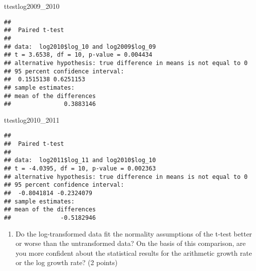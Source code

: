 \documentclass[
]{article}
\newenvironment{Shaded}{\begin{snugshade}}{\end{snugshade}}
\newcommand{\CommentTok}[1]{\textcolor[rgb]{0.56,0.35,0.01}{\textit{#1}}}
\newcommand{\DataTypeTok}[1]{\textcolor[rgb]{0.13,0.29,0.53}{#1}}
\newcommand{\DecValTok}[1]{\textcolor[rgb]{0.00,0.00,0.81}{#1}}
\newcommand{\KeywordTok}[1]{\textcolor[rgb]{0.13,0.29,0.53}{\textbf{#1}}}
\newcommand{\NormalTok}[1]{#1}
\newcommand{\OperatorTok}[1]{\textcolor[rgb]{0.81,0.36,0.00}{\textbf{#1}}}
\newcommand{\OtherTok}[1]{\textcolor[rgb]{0.56,0.35,0.01}{#1}}
\newcommand{\StringTok}[1]{\textcolor[rgb]{0.31,0.60,0.02}{#1}}
\providecommand{\tightlist}{%
  \setlength{\itemsep}{0pt}\setlength{\parskip}{0pt}}
\begin{document}
\begin{Shaded}
\begin{Highlighting}[]
\NormalTok{ttestlog2009_}\DecValTok{2010}
\end{Highlighting}
\end{Shaded}

\begin{verbatim}
## 
##  Paired t-test
## 
## data:  log2010$log_10 and log2009$log_09
## t = 3.6538, df = 10, p-value = 0.004434
## alternative hypothesis: true difference in means is not equal to 0
## 95 percent confidence interval:
##  0.1515138 0.6251153
## sample estimates:
## mean of the differences 
##               0.3883146
\end{verbatim}

\begin{Shaded}
\begin{Highlighting}[]
\NormalTok{ttestlog2010_}\DecValTok{2011}
\end{Highlighting}
\end{Shaded}

\begin{verbatim}
## 
##  Paired t-test
## 
## data:  log2011$log_11 and log2010$log_10
## t = -4.0395, df = 10, p-value = 0.002363
## alternative hypothesis: true difference in means is not equal to 0
## 95 percent confidence interval:
##  -0.8041814 -0.2324079
## sample estimates:
## mean of the differences 
##              -0.5182946
\end{verbatim}

\begin{enumerate}
\def\labelenumi{\arabic{enumi}.}
\setcounter{enumi}{7}
\tightlist
\item
  Do the log-transformed data fit the normality assumptions of the
  t-test better or worse than the untransformed data? On the basis of
  this comparison, are you more confident about the statistical results
  for the arithmetic growth rate or the log growth rate? (2 points)
\end{enumerate}

\begin{Shaded}
\end{Shaded}
\end{document}
